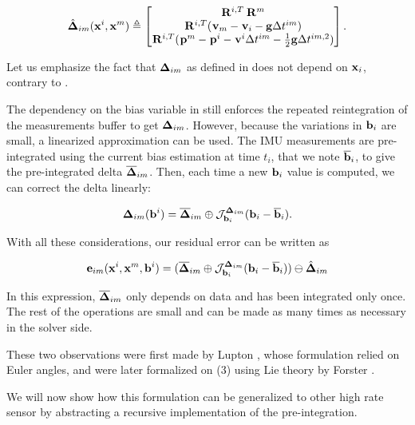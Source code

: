 \begin{align}
    \hat{{\bm \Delta}}_{im}({\bf x}^i, {\bf x}^m) \triangleq 
    \begin{bmatrix}
    \prescript{}{}{{\bf R}}_{}^{i,T} \prescript{}{}{{\bf R}}_{}^{m}  \\
    \prescript{}{}{{\bf R}}_{}^{i,T} (\prescript{}{}{{\bf v}}_{m} - \prescript{}{}{{\bf v}}_{i} - {\bf g} \Delta t^{im})  \\
    \prescript{}{}{{\bf R}}_{}^{i,T}(\prescript{}{}{{\bf p}}_{}^m - \prescript{}{}{{\bf p}}_{}^i - \prescript{}{}{{\bf v}}_{}^i \Delta t^{im} - \frac{1}{2} {\bf g} \Delta t^{im,2})
    \end{bmatrix}.
\end{align}

%
Let us emphasize the fact that ${\bm \Delta}_{im}$ as defined in  does not depend on ${\bf x}_i$, contrary to . 

The dependency on the bias variable in  still enforces the repeated reintegration of the measurements buffer to get ${\bm \Delta}_{im}$. 
However, because the variations in ${\bf b}_i$ are small, a linearized approximation can be used. The IMU measurements are pre-integrated using the current bias estimation at time $t_i$, that we note $\overline{{\bf b}}_i$, to give the pre-integrated delta $\overline{{\bm \Delta}}_{im}$.
Then, each time a new ${\bf b}_i$ value is computed, we can correct the delta linearly:

\begin{align}
    {\bm \Delta}_{im}({\bf b}^i) = \overline{{\bm \Delta}}_{im} \oplus {\mathcal{J}^{{\bm \Delta}_{im}}_{{\bf b}_i}}({\bf b}_i-\overline{{\bf b}}_i).
\end{align}

With all these considerations, our residual error can be written as

\begin{align}
    {\bf e}_{im}({\bf x}^i, {\bf x}^m, {\bf b}^i) = (\overline{{\bm \Delta}}_{im} \oplus {\mathcal{J}^{{\bm \Delta}_{im}}_{{\bf b}_i}}({\bf b}_i-\overline{{\bf b}}_i) ) \ominus \hat{{\bm \Delta}}_{im}
    \label{eq:preint_residual}
\end{align}

In this expression, $\overline{{\bm \Delta}}_{im}$ only depends on data and has been integrated only once. The rest of the operations are small and can be made as many times as necessary in the solver side.

These two observations were first made by Lupton \cite{lupton-09}, whose formulation relied on Euler angles, and were later formalized on \SO(3) using Lie theory
by Forster \cite{forster2017-TRO}. 

We will now show how this formulation can be generalized to other high rate sensor by abstracting a recursive implementation of the pre-integration.



